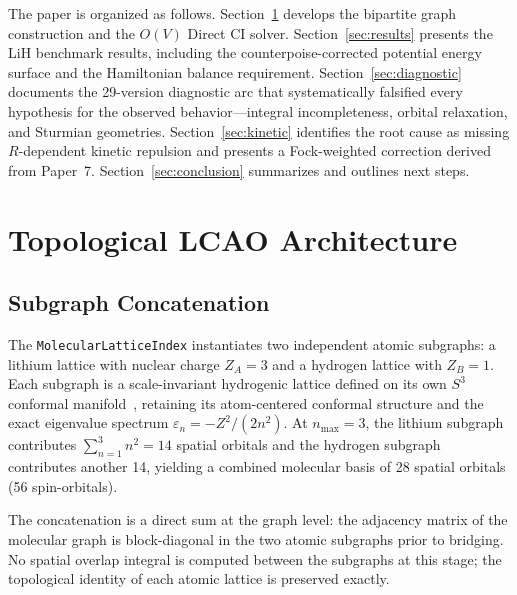 \documentclass[aps,pra,twocolumn,superscriptaddress,longbibliography]{revtex4-2}
\begin{document}
The paper is organized as follows.  Section~\ref{sec:architecture}
develops the bipartite graph construction and the $O(V)$ Direct CI
solver.  Section~\ref{sec:results} presents the LiH benchmark results,
including the counterpoise-corrected potential energy surface and the
Hamiltonian balance requirement.
Section~\ref{sec:diagnostic} documents the 29-version diagnostic arc
that systematically falsified every hypothesis for the observed
behavior---integral incompleteness, orbital
relaxation, and Sturmian geometries.
Section~\ref{sec:kinetic} identifies the root cause as missing
$R$-dependent kinetic repulsion and presents a Fock-weighted correction
derived from Paper~7.
Section~\ref{sec:conclusion} summarizes and outlines next steps.

\section{Topological LCAO Architecture}
\label{sec:architecture}

\subsection{Subgraph Concatenation}
\label{sec:subgraph}

The \texttt{MolecularLatticeIndex} instantiates two independent atomic
subgraphs: a lithium lattice with nuclear charge $Z_A=3$ and a hydrogen
lattice with $Z_B=1$.  Each subgraph is a scale-invariant hydrogenic
lattice defined on its own $S^3$ conformal manifold~\cite{paper7},
retaining its atom-centered conformal structure and the exact eigenvalue
spectrum $\varepsilon_{n} = -Z^2/(2n^2)$.  At $n_{\max}=3$, the lithium
subgraph contributes $\sum_{n=1}^{3}n^2 = 14$ spatial orbitals and the
hydrogen subgraph contributes another 14, yielding a combined molecular
basis of 28 spatial orbitals (56 spin-orbitals).

The concatenation is a direct sum at the graph level: the adjacency
matrix of the molecular graph is block-diagonal in the two atomic
subgraphs prior to bridging.  No spatial overlap integral is computed
between the subgraphs at this stage; the topological identity of each
atomic lattice is preserved exactly.
\end{document}
